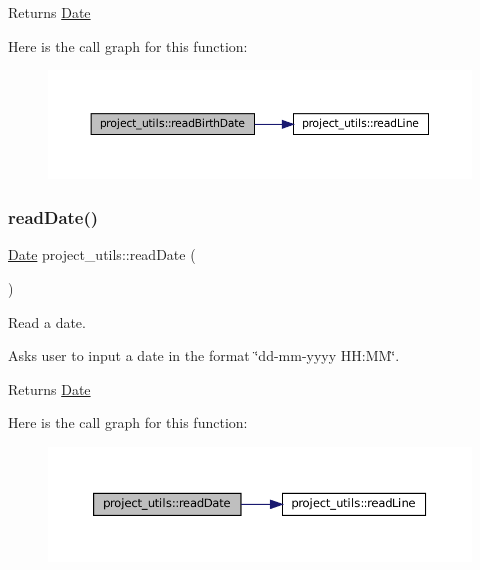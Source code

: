 \begin{DoxyReturn}{Returns}
\mbox{\hyperlink{classDate}{Date}} 
\end{DoxyReturn}
Here is the call graph for this function\+:
\nopagebreak
\begin{figure}[H]
\begin{center}
\leavevmode
\includegraphics[width=350pt]{namespaceproject__utils_adab6593a2685f866191793214c7c60ce_cgraph}
\end{center}
\end{figure}
\mbox{\label{namespaceproject__utils_a747fa96e998a1a6fb365d2512190098e}} 
\subsubsection{\texorpdfstring{read\+Date()}{readDate()}}
{\footnotesize\ttfamily \mbox{\hyperlink{classDate}{Date}} project\+\_\+utils\+::read\+Date (\begin{DoxyParamCaption}{ }\end{DoxyParamCaption})}



Read a date. 

Asks user to input a date in the format \char`\"{}dd-\/mm-\/yyyy H\+H\+:\+M\+M\char`\"{}.

\begin{DoxyReturn}{Returns}
\mbox{\hyperlink{classDate}{Date}} 
\end{DoxyReturn}
Here is the call graph for this function\+:
\nopagebreak
\begin{figure}[H]
\begin{center}
\leavevmode
\includegraphics[width=350pt]{namespaceproject__utils_a747fa96e998a1a6fb365d2512190098e_cgraph}
\end{center}
\end{figure}
\mbox{\label{namespaceproject__utils_aab1cf7fd8bfa2074ed3e6fb99fa973dc}} 
